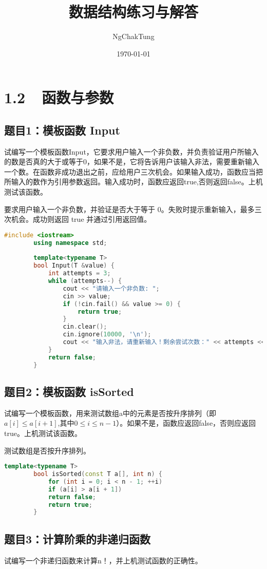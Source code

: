 \documentclass[UTF8]{ctexart}
\title{数据结构练习与解答}
\author{NgChakTung}
\date{\today}
\begin{document}
	\maketitle
	\tableofcontents
	\section{1.2~~函数与参数}
	\subsection{题目1：模板函数 Input}
	试编写一个模板函数Input，它要求用户输入一个非负数，并负责验证用户所输入的数是否真的大于或等于0，如果不是，它将告诉用户该输入非法，需要重新输入一个数。在函数非成功退出之前，应给用户三次机会。如果输入成功，函数应当把所输入的数作为引用参数返回。输入成功时，函数应返回true,否则返回false。上机测试该函数。
	
	要求用户输入一个非负数，并验证是否大于等于 0。失败时提示重新输入，最多三次机会。成功则返回 true 并通过引用返回值。
	
	\begin{lstlisting}[language=C++]
		#include <iostream>
		using namespace std;
		
		template<typename T>
		bool Input(T &value) {
			int attempts = 3;
			while (attempts--) {
				cout << "请输入一个非负数: ";
				cin >> value;
				if (!cin.fail() && value >= 0) {
					return true;
				}
				cin.clear();
				cin.ignore(10000, '\n');
				cout << "输入非法，请重新输入！剩余尝试次数：" << attempts << endl;
			}
			return false;
		}
	\end{lstlisting}
	
	\subsection{题目2：模板函数 isSorted}
	试编写一个模板函数，用来测试数组a中的元素是否按升序排列（即$a[i]\leq a[i+1]$,其中$0 \leq i \le n-1$）。如果不是，函数应返回false，否则应返回true。上机测试该函数。
	
	测试数组是否按升序排列。
	
	\begin{lstlisting}[language=C++]
		template<typename T>
		bool isSorted(const T a[], int n) {
			for (int i = 0; i < n - 1; ++i)
			if (a[i] > a[i + 1])
			return false;
			return true;
		}
	\end{lstlisting}
	
	\subsection{题目3：计算阶乘的非递归函数}
	试编写一个非递归函数来计算n！，并上机测试函数的正确性。
	
\end{document}
